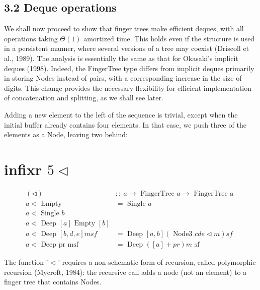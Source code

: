 \documentclass[10pt]{article}
\begin{document}
\subsection*{3.2 Deque operations}
We shall now proceed to show that finger trees make efficient deques, with all operations taking $\Theta(1)$ amortized time. This holds even if the structure is used in a persistent manner, where several versions of a tree may coexist (Driscoll et al., 1989). The analysis is essentially the same as that for Okasaki's implicit deques (1998). Indeed, the FingerTree type differs from implicit deques primarily in storing Nodes instead of pairs, with a corresponding increase in the size of digits. This change provides the necessary flexibility for efficient implementation of concatenation and splitting, as we shall see later.

Adding a new element to the left of the sequence is trivial, except when the initial buffer already contains four elements. In that case, we push three of the elements as a Node, leaving two behind:

\section*{infixr $5 \triangleleft$}
$$
\begin{array}{ll}
(\triangleleft) & :: ~ a \rightarrow \text { FingerTree } a \rightarrow \text { FingerTree a } \\
a \triangleleft \text { Empty } & =\text { Single } a \\
a \triangleleft \text { Single } b & \\
a \triangleleft \text { Deep }[a] \text { Empty }[b] \\
a \triangleleft \text { Deep }[b, d, e] m s f & =\text { Deep }[a, b](\text { Node3 } c d e \triangleleft m) s f \\
a \triangleleft \text { Deep pr msf } & =\text { Deep }([a]+p r) m \text { sf }
\end{array}
$$

The function ' $\triangleleft$ ' requires a non-schematic form of recursion, called polymorphic\\
recursion (Mycroft, 1984): the recursive call adds a node (not an element) to a finger tree that contains Nodes.
\end{document}
